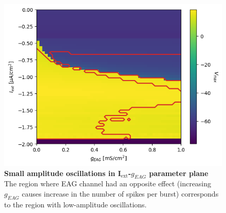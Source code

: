 \documentclass[../main.tex]{subfiles}
\begin{document}
\begin{figure}[!t]
    \centering
    \includegraphics[width=0.6\linewidth]{../img/spiking_to_bursting/low_oscillations.png}
    \caption[Small amplitude oscillations in I$_{\text{ext}}$-$g_{EAG}$ parameter plane]{
        \textbf{Small amplitude oscillations in I$_{\text{ext}}$-$g_{EAG}$ parameter plane}
        The region where EAG channel had an opposite effect (increasing $g_{EAG}$ causes increase in the number of spikes per burst) corresponds to the region with low-amplitude oscillations.
    }
    \label{fig:nonlinearity_eag_small_amplitude_oscillations}
\end{figure}
\end{document}

